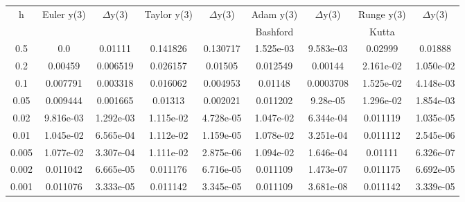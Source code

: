 \documentclass[a4paper,10pt]{article}
\begin{document}
\begin{center}
\begin{longtable}{|| c || c c || c c || c c || c c ||}
\hline
h & Euler y(3) & $\Delta$y(3) & Taylor y(3) & $\Delta$y(3) & Adam y(3) & $\Delta$y(3) & Runge y(3) & $\Delta$y(3) \\
 & & & & & Bashford & & Kutta & \\
\hline
0.5 & 0.0 & 0.01111 & 0.141826 &  0.130717 & 1.525e-03 & 9.583e-03 & 0.02999 & 0.01888 \\
0.2 & 0.00459 & 0.006519 & 0.026157 & 0.01505 & 0.012549 & 0.00144 & 2.161e-02 & 1.050e-02 \\
0.1 & 0.007791 & 0.003318 & 0.016062 & 0.004953 & 0.01148 & 0.0003708 & 1.525e-02 & 4.148e-03 \\
0.05 & 0.009444 & 0.001665 & 0.01313 & 0.002021 & 0.011202 & 9.28e-05 & 1.296e-02 & 1.854e-03 \\
0.02 & 9.816e-03 & 1.292e-03 & 1.115e-02 & 4.728e-05 & 1.047e-02 & 6.344e-04 & 0.011119 & 1.035e-05 \\
0.01 & 1.045e-02 & 6.565e-04 & 1.112e-02 & 1.159e-05 & 1.078e-02 & 3.251e-04 & 0.011112 & 2.545e-06 \\
0.005 & 1.077e-02 & 3.307e-04 & 1.111e-02 & 2.875e-06 & 1.094e-02 & 1.646e-04 & 0.01111 & 6.326e-07 \\
0.002 & 0.011042 & 6.665e-05 & 0.011176 & 6.716e-05 & 0.011109 & 1.473e-07 & 0.011175 & 6.692e-05 \\
0.001 & 0.011076 & 3.333e-05 & 0.011142 & 3.345e-05 & 0.011109 & 3.681e-08 & 0.011142 & 3.339e-05 \\
\hline
\end{longtable}
\end{center}
\end{document}
